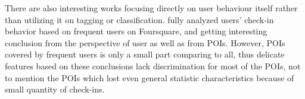 There are also interesting works focusing directly on user behaviour itself rather than utilizing it on tagging or classification. \cite{userbehavior} fully analyzed users' check-in behavior based on frequent users on Foursquare, and getting interesting conclusion from the perspective of user as well as from POIs. However, POIs covered by frequent users is only a small part comparing to all, thus delicate features based on these conclusions lack discrimination for most of the POIs, not to mention the POIs which lost even general statistic characteristics because of small quantity of check-ins.

